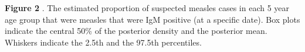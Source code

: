 \textbf{Figure 2} . The estimated proportion of suspected measles cases
in each 5 year age group that were measles that were IgM positive (at a
specific date). Box plots indicate the central 50\% of the posterior
density and the posterior mean. Whiskers indicate the 2.5th and the
97.5th percentiles.